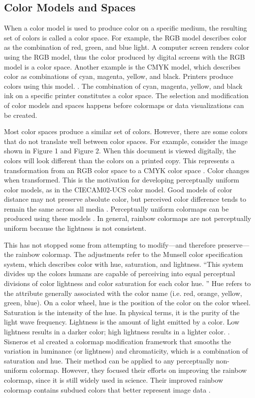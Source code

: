 \documentclass[journal]{IEEEtran}
\begin{document}
\subsection{Color Models and Spaces}

When a color model is used to produce color on a specific medium, the resulting set
of colors is called a color space. For example, the RGB model
describes color as the combination of red, green, and
blue light. A computer screen renders color using the
RGB model, thus the color produced by digital screens
with the RGB model is a color space. Another example is the
CMYK model, which describes color as combinations of
cyan, magenta, yellow, and black. Printers produce colors using this model.
\cite{colormapping}. The combination of cyan, magenta, yellow, and black
ink on a specific printer constitutes a color space. The selection and modification of color
models and spaces happens before colormaps or data visualizations can be created. 

Most color spaces produce a similar set of colors. However, there are some colors
that do not translate well between color spaces. For example, consider the image
shown in Figure 1 and Figure 2. When this document is viewed digitally, the colors will look
different than the colors on a printed copy. This represents
a transformation from an RGB color space to a CMYK color space \cite{colorvblackwhite}.
Color changes when transformed. This is the motivation for developing perceptually
uniform color models, as in the CIECAM02-UCS color model. Good models of color
distance may not preserve absolute color, but perceived color difference tends
to remain the same across all media \cite{ciecam02}. Perceptually uniform colormaps
can be produced using these models \cite{viridis}. In general, rainbow colormaps
are not perceptually uniform because the lightness is not consistent.

This has not stopped some from attempting to modify---and therefore preserve---the
rainbow colormap. The adjustments refer to the Munsell color specification system,
which describes color with hue, saturation, and lightness. ``This system
divides up the colors humans are capable of perceiving
into equal perceptual divisions of color lightness and
color saturation for each color hue. \cite{colormapping}''
Hue refers to the attribute generally associated with the color name (i.e. red,
orange, yellow, green, blue). On a color wheel, hue is the position of the color
on the color wheel. Saturation is the intensity of the hue. In
physical terms, it is the purity of the light wave frequency. Lightness is the
amount of light emitted by a color. Low lightness results in a darker color;
high lightness results in a lighter color. \cite{colorguidelines}.
Sisneros et al created a colormap modification framework that smooths the variation
in luminance (or lightness) and chromaticity, which is a combination of saturation
and hue. Their method can be applied to any perceptually non-uniform colormap.
However, they focused their efforts on improving the rainbow colormap, since it is still widely
used in science. Their improved rainbow colormap contains subdued colors that better
represent image data \cite{chasingrainbows}. 
\end{document}
